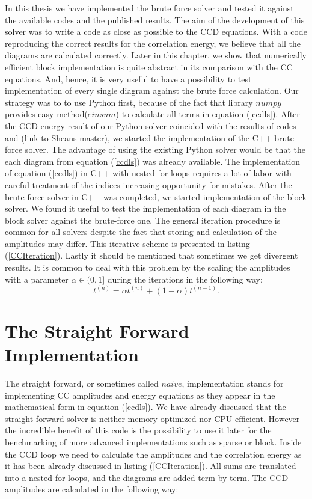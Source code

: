 \documentclass[twoside,english]{uiofysmaster}
\begin{document}
In this thesis we have implemented the brute force solver and tested it against the available codes and the published results. The aim of the development of this solver was to write a code as close as possible to the CCD equations. With a code reproducing the correct results for the correlation energy, we believe that all the diagrams are calculated correctly. Later in this chapter, we show that numerically efficient block implementation is quite abstract in its comparison with the CC equations. And, hence, it is very useful to have a possibility to test implementation of every single diagram against the brute force calculation.
Our strategy was to to use Python first, because of the fact that library $numpy$ provides easy method($einsum$) to calculate all terms in equation (\ref{ccdls}). After the CCD energy result of our Python solver coincided with the results of codes \cite{Hjorth-Jensenadvancedcoursecomputational2017} and (link to Sheans master), we started the implementation of the C++ brute force solver. The advantage of using the existing Python solver would be that the each diagram from equation (\ref{ccdls}) was already available. The implementation of equation (\ref{ccdls}) in C++ with nested for-loops requires a lot of labor with careful treatment of the indices increasing opportunity for mistakes. After the brute force solver in C++ was completed, we started implementation of the block solver. We found it useful to test the implementation of each diagram in the block solver against the brute-force one.
The general iteration procedure is common for all solvers despite the fact that storing and calculation of the amplitudes may differ. This iterative scheme is presented in listing (\ref{CCIteration}).
Lastly it should be mentioned that sometimes we get divergent results. It is common to deal with this problem by the scaling the amplitudes with a parameter $\alpha \in (0,1]$ during the iterations in the following way:
\begin{equation}
t^{(n)} = \alpha t^{(n)} + (1 - \alpha)t^{(n-1)}.
\end{equation} 

\section{The Straight Forward Implementation}
The straight forward, or sometimes called $naive$, implementation stands for implementing CC amplitudes and energy equations as they appear in the mathematical form in equation (\ref{ccdls}). We have already discussed that the straight forward solver is neither memory optimized nor CPU efficient. However the incredible benefit of this code is the possibility to use it later for the benchmarking of more advanced implementations such as sparse or block. Inside the CCD loop we need to calculate the amplitudes and the correlation energy as it has been already discussed in listing (\ref{CCIteration}). All sums are translated into a nested for-loops, and the diagrams are added term by term. The CCD amplitudes are calculated in the following way:
\end{document}
